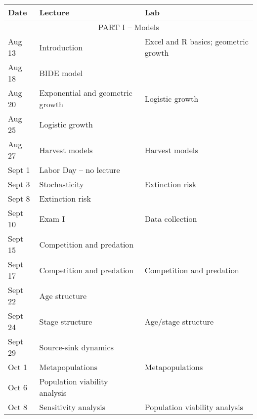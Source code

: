 \documentclass[12pt]{article}
\begin{document}
\begin{center}
\begin{tabular}[c]{lll}
\hline \hline
{\bf Date} & {\bf Lecture}                      & {\bf Lab}                      \\
\hline
           \multicolumn{3}{c}{PART I -- Models}                                        \\
\hline
\hline
Aug 13     & Introduction                       & Excel and R basics; geometric growth \\
\hline
Aug 18     & BIDE model                         &                                      \\
Aug 20     & Exponential and geometric growth   & Logistic growth                      \\
\hline
Aug 25     & Logistic growth                    &                                      \\
Aug 27     & Harvest models                     & Harvest models                       \\
\hline
Sept 1     & Labor Day -- no lecture            &                                      \\
Sept 3     & Stochasticity                      & Extinction risk                      \\
\hline
Sept 8    & Extinction risk                    &                                      \\
Sept 10    & Exam I                             & Data collection                      \\
\hline
Sept 15    & Competition and predation          &                                      \\
Sept 17    & Competition and predation          & Competition and predation            \\
\hline
Sept 22    & Age structure                      &                                      \\
Sept 24    & Stage structure                    & Age/stage structure                  \\
\hline
Sept 29      & Source-sink dynamics               &                                      \\
Oct 1      & Metapopulations                    & Metapopulations                      \\
\hline
Oct 6     & Population viability analysis      &                                      \\
Oct 8     & Sensitivity analysis               & Population viability analysis        \\

\end{tabular}
\end{center}
\end{document}
